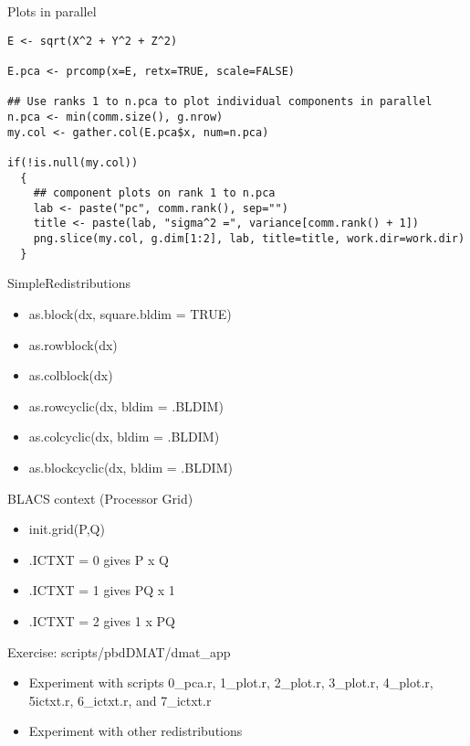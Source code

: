 \begin{frame}
  \begin{exampleblock}{Plots in parallel}\pause
\begin{lstlisting}[title=Now Plot the PCA Components (4\_plot.r)]
E <- sqrt(X^2 + Y^2 + Z^2)

E.pca <- prcomp(x=E, retx=TRUE, scale=FALSE)

## Use ranks 1 to n.pca to plot individual components in parallel
n.pca <- min(comm.size(), g.nrow)
my.col <- gather.col(E.pca$x, num=n.pca)

if(!is.null(my.col))
  {
    ## component plots on rank 1 to n.pca
    lab <- paste("pc", comm.rank(), sep="")
    title <- paste(lab, "sigma^2 =", variance[comm.rank() + 1])
    png.slice(my.col, g.dim[1:2], lab, title=title, work.dir=work.dir)
  }
\end{lstlisting} %
  \end{exampleblock}
\end{frame}

\begin{frame}
  \begin{block}{SimpleRedistributions}\pause
  \begin{itemize}
\item as.block(dx, square.bldim = TRUE)
\item as.rowblock(dx)
\item as.colblock(dx)
\item as.rowcyclic(dx, bldim = .BLDIM)
\item as.colcyclic(dx, bldim = .BLDIM)
\item as.blockcyclic(dx, bldim = .BLDIM)
  \end{itemize}
  \end{block}
  \begin{block}{BLACS context (Processor Grid)}\pause
  \begin{itemize}
\item init.grid(P,Q)
\item .ICTXT = 0 gives P x Q 
\item .ICTXT = 1 gives PQ x 1
\item .ICTXT = 2 gives 1 x PQ
  \end{itemize}
  \end{block}
\end{frame}

\begin{frame}
  \begin{block}{Exercise: scripts/pbdDMAT/dmat\_app}\pause
  \begin{itemize}
  \item Experiment with scripts 0\_pca.r, 1\_plot.r, 2\_plot.r,
    3\_plot.r, 4\_plot.r, 5\-ictxt.r, 6\_ictxt.r, and 7\_ictxt.r
  \item Experiment with other redistributions
  \end{itemize}
  \end{block}
\end{frame}

